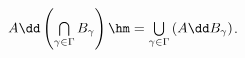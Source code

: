 
            $A\dd\left(\bigcap\limits_{\gamma\in\Gamma} B_\gamma\right)\hm=
            \bigcup\limits_{\gamma\in\Gamma} \left(A\dd B_\gamma\right)$.
        